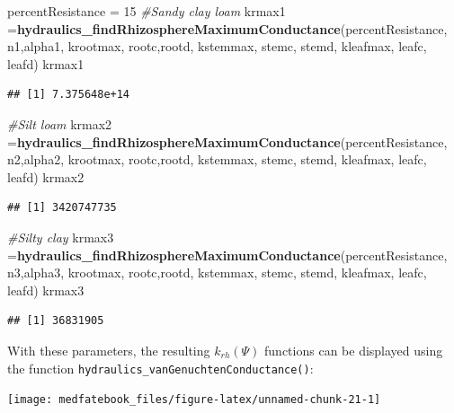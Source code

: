 \documentclass[]{book}
\newenvironment{Shaded}{\begin{snugshade}}{\end{snugshade}}
\newcommand{\KeywordTok}[1]{\textcolor[rgb]{0.13,0.29,0.53}{\textbf{#1}}}
\newcommand{\DecValTok}[1]{\textcolor[rgb]{0.00,0.00,0.81}{#1}}
\newcommand{\StringTok}[1]{\textcolor[rgb]{0.31,0.60,0.02}{#1}}
\newcommand{\CommentTok}[1]{\textcolor[rgb]{0.56,0.35,0.01}{\textit{#1}}}
\newcommand{\NormalTok}[1]{#1}
\begin{document}
\begin{Shaded}
\begin{Highlighting}[]
\NormalTok{percentResistance =}\StringTok{ }\DecValTok{15}
\CommentTok{#Sandy clay loam }
\NormalTok{krmax1 =}\KeywordTok{hydraulics_findRhizosphereMaximumConductance}\NormalTok{(percentResistance, }
\NormalTok{                      n1,alpha1, krootmax, rootc,rootd, kstemmax, stemc, stemd,}
\NormalTok{                      kleafmax, leafc, leafd)}
\NormalTok{krmax1}
\end{Highlighting}
\end{Shaded}

\begin{verbatim}
## [1] 7.375648e+14
\end{verbatim}

\begin{Shaded}
\begin{Highlighting}[]
\CommentTok{#Silt loam}
\NormalTok{krmax2 =}\KeywordTok{hydraulics_findRhizosphereMaximumConductance}\NormalTok{(percentResistance, }
\NormalTok{                      n2,alpha2, krootmax, rootc,rootd, kstemmax, stemc, stemd,}
\NormalTok{                      kleafmax, leafc, leafd)}
\NormalTok{krmax2}
\end{Highlighting}
\end{Shaded}

\begin{verbatim}
## [1] 3420747735
\end{verbatim}

\begin{Shaded}
\begin{Highlighting}[]
\CommentTok{#Silty clay}
\NormalTok{krmax3 =}\KeywordTok{hydraulics_findRhizosphereMaximumConductance}\NormalTok{(percentResistance, }
\NormalTok{                      n3,alpha3, krootmax, rootc,rootd, kstemmax, stemc, stemd,}
\NormalTok{                      kleafmax, leafc, leafd)}
\NormalTok{krmax3}
\end{Highlighting}
\end{Shaded}

\begin{verbatim}
## [1] 36831905
\end{verbatim}

With these parameters, the resulting \(k_{rh}(\Psi)\) functions can be
displayed using the function
\texttt{hydraulics\_vanGenuchtenConductance()}:

\begin{center}\texttt{[image: medfatebook\_files/figure-latex/unnamed-chunk-21-1]} \end{center}
\end{document}
